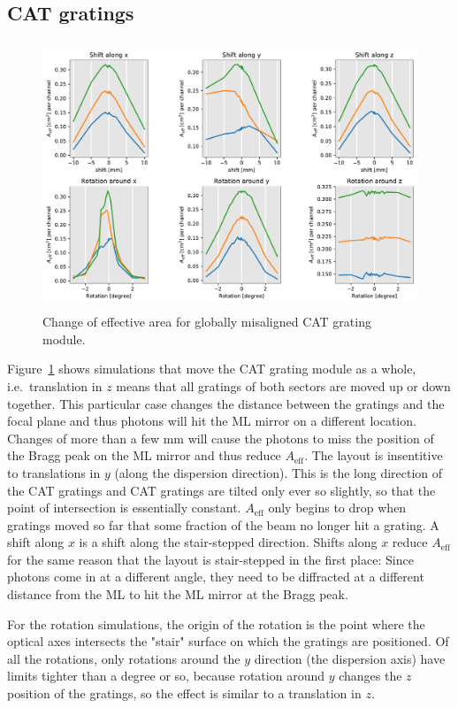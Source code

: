 \documentclass[]{spie}  %
\begin{document}
\subsection{CAT gratings}
\begin{figure} [ht]
  \begin{center}
    \includegraphics[height=8cm]{CAT_global.pdf}
  \end{center}
  \caption
      { \label{fig:CAT_global}Change of effective area for globally misaligned CAT grating module. 
}
\end{figure}
Figure~\ref{fig:CAT_global} shows simulations that move the CAT
grating module as a whole, i.e.\ translation in $z$ means that all
gratings of both sectors are moved up or down together. This
particular case changes the distance between the gratings and the
focal plane and thus photons will hit the ML mirror on a different
location. Changes of more than a few mm will cause the photons to miss
the position of the Bragg peak on the ML mirror and thus reduce
$A_{\mathrm{eff}}$. The layout is insentitive to translations in $y$
(along the dispersion direction). This is the long direction of the
CAT gratings and CAT gratings are tilted only ever so slightly, so
that the point of intersection is essentially
constant. $A_{\mathrm{eff}}$ only begins to drop when gratings
moved so far that some fraction of the beam no longer hit a grating. A
shift along $x$ is a shift along the stair-stepped direction. Shifts
along $x$ reduce $A_{\mathrm{eff}}$ for the same reason that the
layout is stair-stepped in the first place: Since photons come in at a
different angle, they need to be diffracted at a different distance
from the ML to hit the ML mirror at the Bragg peak.

For the rotation simulations, the origin of the rotation is the point
where the optical axes intersects the "stair" surface on which the
gratings are positioned. Of all the rotations, only rotations around
the $y$ direction (the dispersion axis) have limits tighter than a
degree or so, because rotation around $y$ changes the $z$ position of
the gratings, so the effect is similar to a translation in $z$.
\end{document}
